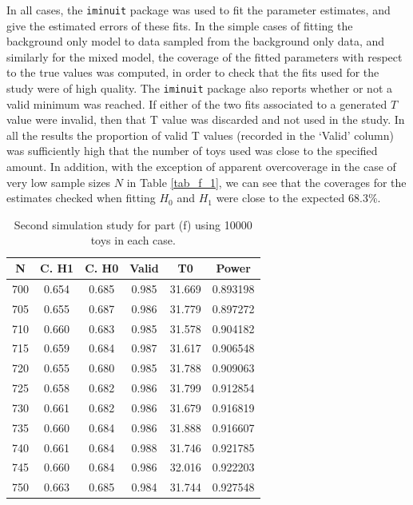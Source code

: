 \documentclass[12pt]{article}
\begin{document}
In all cases, the \texttt{iminuit} package was used to fit the parameter estimates, and give the estimated errors of these fits.
In the simple cases of fitting the background only model to data sampled from the background only data, and similarly for the mixed model, the coverage of the fitted parameters with respect to the true values was computed, in order to check that the fits used for the study were of high quality.
The \texttt{iminuit} package also reports whether or not a valid minimum was reached.
If either of the two fits associated to a generated $T$ value were invalid, then that T value was discarded and not used in the study.
In all the results the proportion of valid T values (recorded in the `Valid' column) was sufficiently high that the number of toys used was close to the specified amount.
In addition, with the exception of apparent overcoverage in the case of very low sample sizes $N$ in Table \ref{tab_f_1}, we can see that the coverages for the estimates checked when fitting $H_0$ and $H_1$ were close to the expected 68.3\%.

\begin{table}
    \centering
    \begin{tabular}{| c | c | c | c | c | c |}
        \hline
          N & C. H1   & C. H0    & Valid   & T0       & Power    \\
        \hline
        700 & 0.654   & 0.685    & 0.985   & 31.669   & 0.893198 \\
        \hline
        705 & 0.655   & 0.687    & 0.986   & 31.779   & 0.897272 \\
        \hline
        710 & 0.660   & 0.683    & 0.985   & 31.578   & 0.904182 \\
        \hline
        715 & 0.659   & 0.684    & 0.987   & 31.617   & 0.906548 \\
        \hline
        720 & 0.655   & 0.680    & 0.985   & 31.788   & 0.909063 \\
        \hline
        725 & 0.658   & 0.682    & 0.986   & 31.799   & 0.912854 \\
        \hline
        730 & 0.661   & 0.682    & 0.986   & 31.679   & 0.916819 \\
        \hline
        735 & 0.660   & 0.684    & 0.986   & 31.888   & 0.916607 \\
        \hline
        740 & 0.661   & 0.684    & 0.988   & 31.746   & 0.921785 \\
        \hline
        745 & 0.660   & 0.684    & 0.986   & 32.016   & 0.922203 \\
        \hline
        750 & 0.663   & 0.685    & 0.984   & 31.744   & 0.927548 \\
        \hline
    \end{tabular}
\caption{Second simulation study for part (f) using 10000 toys in each case.}
\label{tab_f_2}
\end{table}
\end{document}
